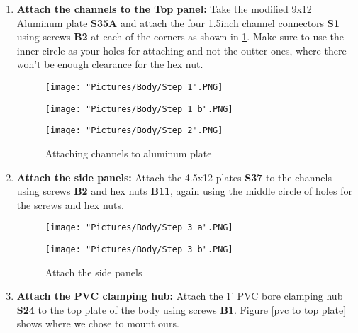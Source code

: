 \documentclass[12pt]{article}
\begin{document}
\begin{enumerate}
\item \textbf{Attach the channels to the Top panel: } Take the modified 9x12 Aluminum plate \textbf{S35A} and attach the four 1.5inch channel connectors \textbf{S1} using screws \textbf{B2} at each of the corners as shown in \ref{channel to al plate}. Make sure to use the inner circle as your holes for attaching and not the outter ones, where there won't be enough clearance for the hex nut. 

\begin{figure}[H]
  	\centering
  	\begin{minipage}[b]{0.20\textwidth}
    		\texttt{[image: "Pictures/Body/Step 1".PNG]}
  	\end{minipage}
  	\hfill
  	\begin{minipage}[b]{0.30\textwidth}
    		\texttt{[image: "Pictures/Body/Step 1 b".PNG]}
  	\end{minipage}
    	\hfill
  	\begin{minipage}[b]{0.40\textwidth}
    		\texttt{[image: "Pictures/Body/Step 2".PNG]}
  	\end{minipage}
  	\caption{Attaching channels to aluminum plate}
	\label{channel to al plate}
\end{figure}

\item \textbf{Attach the side panels: } Attach the 4.5x12 plates \textbf{S37} to the channels using screws \textbf{B2} and hex nuts \textbf{B11}, again using the middle circle of holes for the screws and hex nuts. 

\begin{figure}[H]
 	\centering
 	\begin{minipage}[b]{0.45\textwidth}
    		\texttt{[image: "Pictures/Body/Step 3 a".PNG]}
  	\end{minipage}
  	\hfill
  	\begin{minipage}[b]{0.45\textwidth}
    		\texttt{[image: "Pictures/Body/Step 3 b".PNG]}
  	\end{minipage}
  	\caption{Attach the side panels}
	\label{Body side panels}
\end{figure}

\item \textbf{Attach the PVC clamping hub:} Attach the 1' PVC bore clamping hub \textbf{S24} to the top plate of the body using screws \textbf{B1}. Figure \ref{pvc to top plate} shows where we chose to mount ours. 


\end{enumerate}
\end{document}
